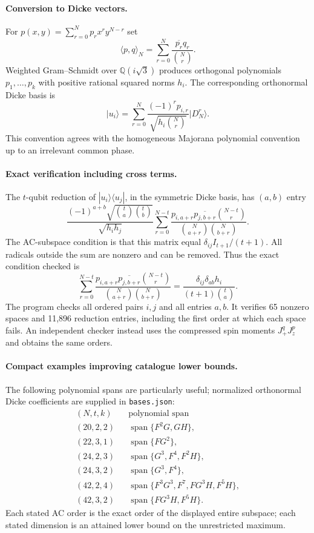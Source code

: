\documentclass[11pt]{article}
\newcommand{\D}[2]{\lvert D_{#1}^{#2}\rangle}
\begin{document}
\paragraph{Conversion to Dicke vectors.}
For $p(x,y)=\sum_{r=0}^N p_rx^ry^{N-r}$ set
\[
 \langle p,q\rangle_N=\sum_{r=0}^N
 \frac{\overline{p_r}q_r}{\binom Nr}.
\]
Weighted Gram--Schmidt over $\mathbb Q(i\sqrt3)$ produces orthogonal
polynomials $p_1,\ldots,p_k$ with positive rational squared norms $h_i$.
The corresponding orthonormal Dicke basis is
\[
 |u_i\rangle=\sum_{r=0}^N
 \frac{(-1)^rp_{i,r}}{\sqrt{h_i\binom Nr}}\D Nr.
\]
This convention agrees with the homogeneous Majorana polynomial convention
up to an irrelevant common phase.

\paragraph{Exact verification including cross terms.}
The $t$-qubit reduction of $|u_i\rangle\langle u_j|$, in the symmetric Dicke
basis, has $(a,b)$ entry
\[
 \frac{(-1)^{a+b}\sqrt{\binom ta\binom tb}}{\sqrt{h_ih_j}}
 \sum_{r=0}^{N-t}
 \frac{p_{i,a+r}\overline{p_{j,b+r}}\binom{N-t}r}
      {\binom N{a+r}\binom N{b+r}}.
\]
The AC-subspace condition is that this matrix equal
$\delta_{ij}I_{t+1}/(t+1)$. All radicals outside the sum are nonzero and
can be removed. Thus the exact condition checked is
\[
 \sum_{r=0}^{N-t}
 \frac{p_{i,a+r}\overline{p_{j,b+r}}\binom{N-t}r}
      {\binom N{a+r}\binom N{b+r}}
 =\frac{\delta_{ij}\delta_{ab}h_i}{(t+1)\binom ta}.
\]
The program checks all ordered pairs $i,j$ and all entries $a,b$.
It verifies 65 nonzero spaces and 11,896 reduction entries, including the
first order at which each space fails. An independent checker instead uses
the compressed spin moments $J_+^qJ_z^p$ and obtains the same orders.

\paragraph{Compact examples improving catalogue lower bounds.}
The following polynomial spans are particularly useful; normalized
orthonormal Dicke coefficients are supplied in \texttt{bases.json}:
\[
\begin{array}{ccl}
 (N,t,k)& &\text{polynomial span}\\ \hline
 (20,2,2)&&\operatorname{span}\{F^2G,GH\},\\
 (22,3,1)&&\operatorname{span}\{FG^2\},\\
 (24,2,3)&&\operatorname{span}\{G^3,F^4,F^2H\},\\
 (24,3,2)&&\operatorname{span}\{G^3,F^4\},\\
 (42,2,4)&&\operatorname{span}\{F^3G^3,F^7,FG^3H,F^5H\},\\
 (42,3,2)&&\operatorname{span}\{FG^3H,F^5H\}.
\end{array}
\]
Each stated AC order is the exact order of the displayed entire subspace;
each stated dimension is an attained lower bound on the unrestricted
maximum.
\end{document}
